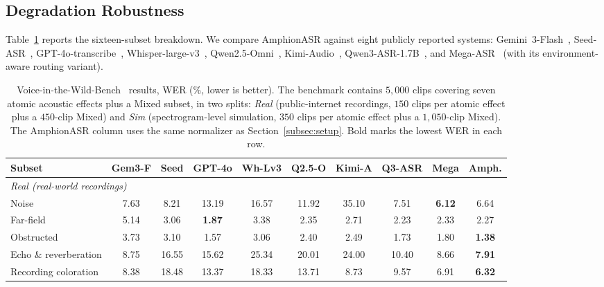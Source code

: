 \subsection{Degradation Robustness}
\label{sec:noise}

\label{subsec:vitw-results}

Table~\ref{tab:vitw_bench} reports the sixteen-subset breakdown.
We compare AmphionASR against eight publicly reported systems:
Gemini~3-Flash~\cite{comanici2025gemini}, Seed-ASR~\cite{bai2024seedasr},
GPT-4o-transcribe~\cite{openai2024gpt4o},
Whisper-large-v3~\cite{radford2023whisper},
Qwen2.5-Omni~\cite{xu2025qwen25omni}, Kimi-Audio~\cite{kimiaudio2025},
Qwen3-ASR-1.7B~\cite{qwen2025qwen3asr}, and Mega-ASR~\cite{xie2026mega}
(with its environment-aware routing variant).

\begin{table}[t]
  \caption{Voice-in-the-Wild-Bench~\cite{xie2026mega} results, WER
    (\%, lower is better). The benchmark contains $5{,}000$ clips
    covering seven atomic acoustic effects plus a Mixed subset, in
    two splits: \emph{Real} (public-internet recordings, $150$ clips
    per atomic effect plus a $450$-clip Mixed) and \emph{Sim}
    (spectrogram-level simulation, $350$ clips per atomic effect plus
    a $1{,}050$-clip Mixed). The AmphionASR column uses the same
    normalizer as Section~\ref{subsec:setup}. Bold marks the lowest
    WER in each row.}
  \label{tab:vitw_bench}
  \centering
  \scriptsize
  \setlength{\tabcolsep}{3pt}
  \begin{tabular}{l@{\hspace{3pt}}ccccccccc}
    \toprule
    Subset & Gem3-F & Seed & GPT-4o & Wh-Lv3 & Q2.5-O & Kimi-A & Q3-ASR & Mega & \textbf{Amph.} \\
    \midrule
    \multicolumn{10}{l}{\emph{Real (real-world recordings)}} \\
    \midrule
    Noise                  & 7.63  & 8.21  & 13.19 & 16.57 & 11.92 & 35.10 & 7.51  & \textbf{6.12} & 6.64 \\
    Far-field              & 5.14  & 3.06  & \textbf{1.87} & 3.38  & 2.35  & 2.71  & 2.23  & 2.33  & 2.27 \\
    Obstructed             & 3.73  & 3.10  & 1.57  & 3.06  & 2.40  & 2.49  & 1.73  & 1.80  & \textbf{1.38} \\
    Echo \& reverberation  & 8.75  & 16.55 & 15.62 & 25.34 & 20.01 & 24.00 & 10.40 & 8.66  & \textbf{7.91} \\
    Recording coloration   & 8.38  & 18.48 & 13.37 & 18.33 & 13.71 & 8.73  & 9.57  & 6.91  & \textbf{6.32} \\

\end{tabular}
\end{table}
